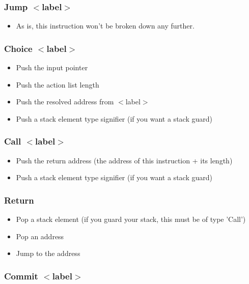 \subsubsection{Jump $<$label$>$}

\begin{itemize}
\item As is, this instruction won't be broken down any further.
\end{itemize}

\subsubsection{Choice $<$label$>$}

\begin{itemize}
\item Push the input pointer
\item Push the action list length
\item Push the resolved address from $<$label$>$
\item Push a stack element type signifier (if you want a stack guard)
\end{itemize}

\subsubsection{Call $<$label$>$}

\begin{itemize}
\item Push the return address (the address of this instruction + its length)
\item Push a stack element type signifier (if you want a stack guard)
\end{itemize}

\subsubsection{Return}

\begin{itemize}
\item Pop a stack element (if you guard your stack, this must be of type 'Call')
\item Pop an address
\item Jump to the address
\end{itemize}

\subsubsection{Commit $<$label$>$}

